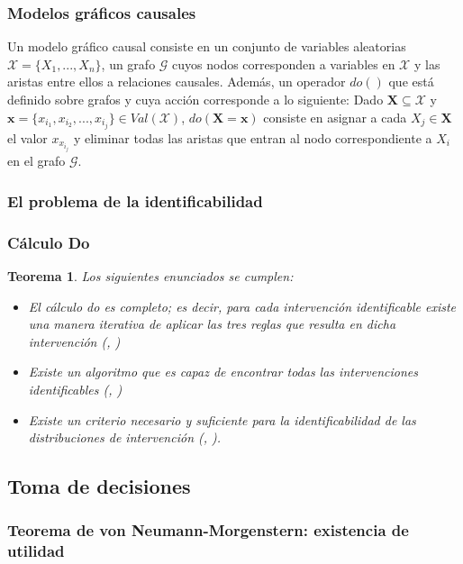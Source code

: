 \documentclass[11pt]{article}
\theoremstyle{plain}
\newtheorem{teo}{Teorema}
\begin{document}
		\subsubsection{Modelos gráficos causales}
		Un modelo gráfico causal consiste en un conjunto de variables aleatorias $\mathcal{X}=\{ X_1,...,X_n \}$, un grafo $\mathcal{G}$ cuyos nodos corresponden a variables en $\mathcal{X}$ y las aristas entre ellos a relaciones causales. Además, un operador $do()$ que está definido sobre grafos y cuya acción corresponde a lo siguiente: Dado $\mathbf{X} \subseteq \mathcal{X}$ y $\mathbf{x} = \{ x_{i_1}, x_{i_2}, ... , x_{i_j} \} \in Val(\mathcal{X})$, $do(\mathbf{X} = \mathbf{x} )$ consiste en asignar a cada $X_j \in \mathbf{X}$ el valor $x_{x_{i_j}}$ y eliminar todas las aristas que entran al nodo correspondiente a $X_i$ en el grafo $\mathcal{G}$.
		\subsubsection{El problema de la identificabilidad}
		\subsubsection{Cálculo Do}
		\begin{teo}{\cite{peters2017elements}}
		Los siguientes enunciados se cumplen:
		\begin{itemize}
		\item El cálculo do es completo; es decir, para cada intervención identificable existe una manera iterativa de aplicar las tres reglas que resulta en dicha intervención (\cite{huang2006pearl}, \cite{shpitser2006identification})
		\item Existe un algoritmo que es capaz de encontrar todas las intervenciones identificables (\cite{tian2002}, \cite{huang2006pearl})
		\item Existe un criterio necesario y suficiente para la identificabilidad de las distribuciones de intervención (\cite{shpitser2006identification}, \cite{huang2006pearl}).
		\end{itemize}
		\end{teo}
	\subsection{Toma de decisiones}
		\subsubsection{Teorema de von Neumann-Morgenstern: existencia de utilidad}
\end{document}
